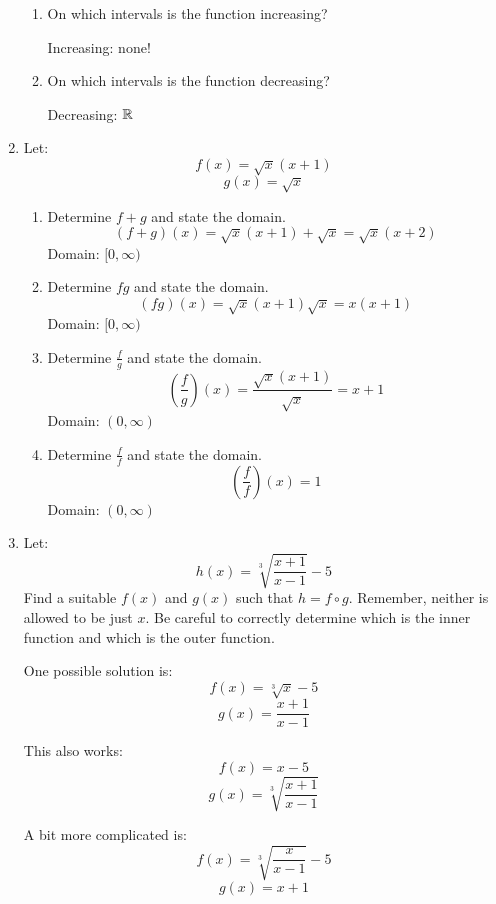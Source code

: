 \documentclass[letterpaper,12pt,fleqn]{article}
\begin{document}
\begin{enumerate}
\begin{enumerate}
\item On which intervals is the function increasing?

\bigskip

Increasing: none!

\bigskip

\item On which intervals is the function decreasing?

\bigskip

Decreasing: $\mathbb{R}$

\bigskip

\end{enumerate}

\bigskip

\item Let:
\[f(x)=\sqrt{x}(x+1)\]
\[g(x)=\sqrt{x}\]
\begin{enumerate}
\item Determine $f+g$ and state the domain.
\[(f+g)(x)=\sqrt{x}(x+1)+\sqrt{x}=\sqrt{x}(x+2)\]
Domain: $[0,\infty)$

\bigskip

\item Determine $fg$ and state the domain.
\[(fg)(x)=\sqrt{x}(x+1)\sqrt{x}=x(x+1)\]
Domain: $[0,\infty)$

\bigskip

\item Determine $\frac{f}{g}$ and state the domain.
\[\left(\frac{f}{g}\right)(x)=\frac{\sqrt{x}(x+1)}{\sqrt{x}}=x+1\]
Domain: $(0,\infty)$

\bigskip

\item Determine $\frac{f}{f}$ and state the domain.
\[\left(\frac{f}{f}\right)(x)=1\]
Domain: $(0,\infty)$

\end{enumerate}

\bigskip

\item Let:
\[h(x)=\sqrt[3]{\frac{x+1}{x-1}}-5\]
Find a suitable $f(x)$ and $g(x)$ such that $h=f\circ g$. Remember, neither is
allowed to be just $x$. Be careful to correctly determine which is the inner
function and which is the outer function.

\bigskip

One possible solution is:
\[f(x)=\sqrt[3]{x}-5\]
\[g(x)=\frac{x+1}{x-1}\]

This also works:
\[f(x)=x-5\]
\[g(x)=\sqrt[3]{\frac{x+1}{x-1}}\]

A bit more complicated is:
\[f(x)=\sqrt[3]{\frac{x}{x-1}}-5\]
\[g(x)=x+1\]


\end{enumerate}
\end{document}
